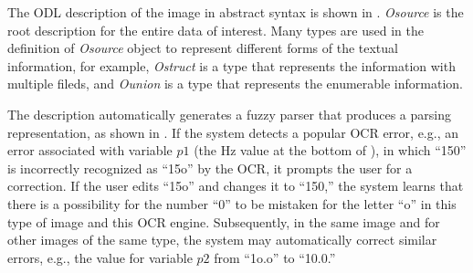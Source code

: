 The ODL description of the image in abstract syntax is shown
in . 
{\em Osource} is the root description for the entire data of interest. 
Many types are used in the definition of {\em Osource} object to represent 
different forms of the textual information, 
for example, {\em Ostruct} is a type that 
represents the information with multiple fileds, and {\em Ounion} is a 
type that represents the enumerable information. 

%





The description automatically generates a fuzzy parser 
that produces a parsing representation, as shown in . 
If the system detects a popular OCR error, e.g., an error associated with
variable $p1$ (the Hz value at the bottom of ),
in which ``150'' is incorrectly recognized as ``15o'' by the OCR,
it prompts the user for a correction. If the user edits 
``15o'' and changes it to ``150,'' the system learns 
that there is a possibility for the number ``0'' 
to be mistaken for the letter ``o'' in this type of image and this OCR engine.
Subsequently, in the same image and for other images of the same type, 
the system may automatically  correct similar errors, e.g., 
the value for variable $p2$ from ``1o.o'' to ``10.0.'' 

